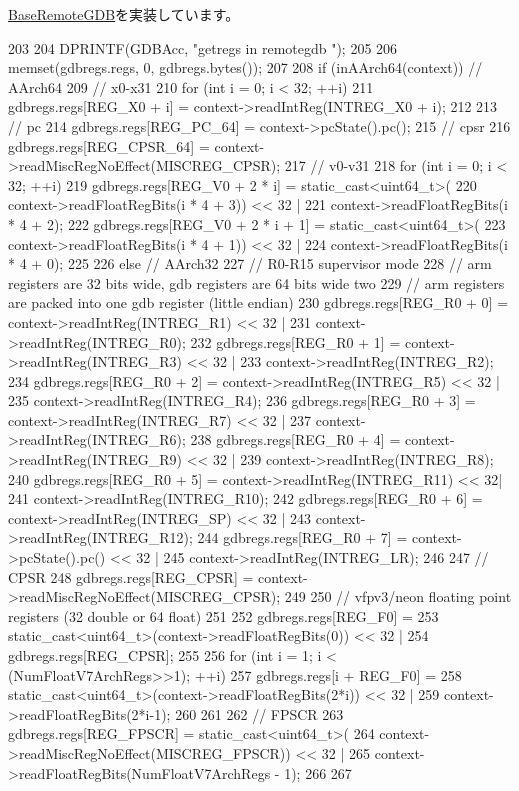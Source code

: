 \hyperlink{classBaseRemoteGDB_aca04756a764f2ef2add9ee91be012659}{BaseRemoteGDB}を実装しています。


\begin{DoxyCode}
203 {
204     DPRINTF(GDBAcc, "getregs in remotegdb \n");
205 
206     memset(gdbregs.regs, 0, gdbregs.bytes());
207 
208     if (inAArch64(context)) {  // AArch64
209         // x0-x31
210         for (int i = 0; i < 32; ++i) {
211             gdbregs.regs[REG_X0 + i] = context->readIntReg(INTREG_X0 + i);
212         }
213         // pc
214         gdbregs.regs[REG_PC_64] = context->pcState().pc();
215         // cpsr
216         gdbregs.regs[REG_CPSR_64] = context->readMiscRegNoEffect(MISCREG_CPSR);
217         // v0-v31
218         for (int i = 0; i < 32; ++i) {
219             gdbregs.regs[REG_V0 + 2 * i] = static_cast<uint64_t>(
220                 context->readFloatRegBits(i * 4 + 3)) << 32 |
221                     context->readFloatRegBits(i * 4 + 2);
222             gdbregs.regs[REG_V0 + 2 * i + 1] = static_cast<uint64_t>(
223                 context->readFloatRegBits(i * 4 + 1)) << 32 |
224                     context->readFloatRegBits(i * 4 + 0);
225         }
226     } else {  // AArch32
227         // R0-R15 supervisor mode
228         // arm registers are 32 bits wide, gdb registers are 64 bits wide two
229         // arm registers are packed into one gdb register (little endian)
230         gdbregs.regs[REG_R0 + 0] = context->readIntReg(INTREG_R1) << 32 |
231             context->readIntReg(INTREG_R0);
232         gdbregs.regs[REG_R0 + 1] = context->readIntReg(INTREG_R3) << 32 |
233             context->readIntReg(INTREG_R2);
234         gdbregs.regs[REG_R0 + 2] = context->readIntReg(INTREG_R5) << 32 |
235             context->readIntReg(INTREG_R4);
236         gdbregs.regs[REG_R0 + 3] = context->readIntReg(INTREG_R7) << 32 |
237             context->readIntReg(INTREG_R6);
238         gdbregs.regs[REG_R0 + 4] = context->readIntReg(INTREG_R9) << 32 |
239             context->readIntReg(INTREG_R8);
240         gdbregs.regs[REG_R0 + 5] = context->readIntReg(INTREG_R11) << 32|
241             context->readIntReg(INTREG_R10);
242         gdbregs.regs[REG_R0 + 6] = context->readIntReg(INTREG_SP) << 32 |
243             context->readIntReg(INTREG_R12);
244         gdbregs.regs[REG_R0 + 7] = context->pcState().pc() << 32        |
245             context->readIntReg(INTREG_LR);
246 
247         // CPSR
248         gdbregs.regs[REG_CPSR]  = context->readMiscRegNoEffect(MISCREG_CPSR);
249 
250         // vfpv3/neon floating point registers (32 double or 64 float)
251 
252         gdbregs.regs[REG_F0] =
253             static_cast<uint64_t>(context->readFloatRegBits(0)) << 32 |
254             gdbregs.regs[REG_CPSR];
255 
256         for (int i = 1; i < (NumFloatV7ArchRegs>>1); ++i) {
257             gdbregs.regs[i + REG_F0] =
258                 static_cast<uint64_t>(context->readFloatRegBits(2*i)) << 32 |
259                 context->readFloatRegBits(2*i-1);
260         }
261 
262         // FPSCR
263         gdbregs.regs[REG_FPSCR] = static_cast<uint64_t>(
264             context->readMiscRegNoEffect(MISCREG_FPSCR)) << 32 |
265                 context->readFloatRegBits(NumFloatV7ArchRegs - 1);
266     }
267 }
\end{DoxyCode}
